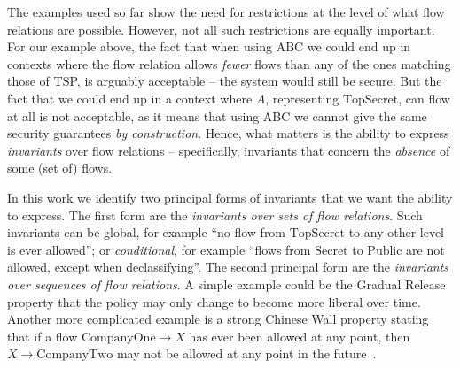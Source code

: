 The examples used so far show the need for restrictions at the level of what flow relations are
possible. However, not all such restrictions are equally important. For our example above, the
fact that when using ABC we could end up in contexts where the flow relation allows \emph{fewer}
flows than any of the ones matching those of TSP, is arguably acceptable -- the system would
still be secure. But the fact that we could end up in a context where $A$, representing $\text{TopSecret}$,
can flow at all is not acceptable, as it means that using ABC we cannot give the same security
guarantees \emph{by construction}. Hence, what matters is the ability to express
\emph{invariants} over flow relations -- specifically, invariants that concern the \emph{absence}
of some (set of) flows.

In this work we identify two principal forms of invariants that we want the ability to express.
The first form are the \emph{invariants over sets of flow relations}. Such invariants can be
global, for example ``no flow from $\text{TopSecret}$ to any other level is ever allowed'';
or \emph{conditional}, for example ``flows from $\text{Secret}$ to $\text{Public}$ are not
allowed, except when declassifying''. The second principal form are the
\emph{invariants over sequences of flow relations}. A simple example could be the
Gradual Release property \cite{Askarov:Sabelfeld:Gradual} that the policy may only
change to become more liberal over time. Another more complicated example is a strong
Chinese Wall property stating that if a flow $\text{CompanyOne} \rightarrow X$ has ever
been allowed at any point, then $X \rightarrow \text{CompanyTwo}$ may not be allowed at
any point in the future~\cite{brewer1989chinese}. 

